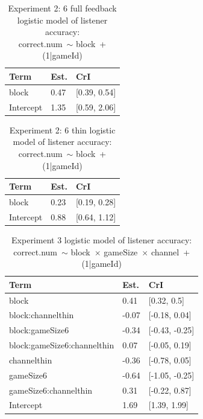 \documentclass[
  english,
  a4paper,
]{article}
\begin{document}
\begin{table}[h!]

\caption{\label{tab:unnamed-chunk-11}Experiment 2: 6 full feedback logistic model of listener accuracy:\\ correct.num~$\sim$ block~+ (1|gameId)}
\centering
\begin{tabular}[t]{lll}
\toprule
Term & Est. & CrI\\
\midrule
block & 0.47 & {}[0.39, 0.54]\\
Intercept & 1.35 & {}[0.59, 2.06]\\
\bottomrule
\end{tabular}
\end{table}

\begin{table}[h!]

\caption{\label{tab:unnamed-chunk-11}Experiment 2: 6 thin logistic model of listener accuracy:\\ correct.num~$\sim$ block~+ (1|gameId)}
\centering
\begin{tabular}[t]{lll}
\toprule
Term & Est. & CrI\\
\midrule
block & 0.23 & {}[0.19, 0.28]\\
Intercept & 0.88 & {}[0.64, 1.12]\\
\bottomrule
\end{tabular}
\end{table}

\begin{table}[h!]

\caption{\label{tab:unnamed-chunk-11}Experiment 3 logistic model of listener accuracy:\\ correct.num~$\sim$ block~$\times$ gameSize~$\times$ channel~+ (1|gameId)}
\centering
\begin{tabular}[t]{lll}
\toprule
Term & Est. & CrI\\
\midrule
block & 0.41 & {}[0.32, 0.5]\\
block:channelthin & -0.07 & {}[-0.18, 0.04]\\
block:gameSize6 & -0.34 & {}[-0.43, -0.25]\\
block:gameSize6:channelthin & 0.07 & {}[-0.05, 0.19]\\
channelthin & -0.36 & {}[-0.78, 0.05]\\
\addlinespace
gameSize6 & -0.64 & {}[-1.05, -0.25]\\
gameSize6:channelthin & 0.31 & {}[-0.22, 0.87]\\
Intercept & 1.69 & {}[1.39, 1.99]\\
\bottomrule
\end{tabular}
\end{table}
\end{document}
